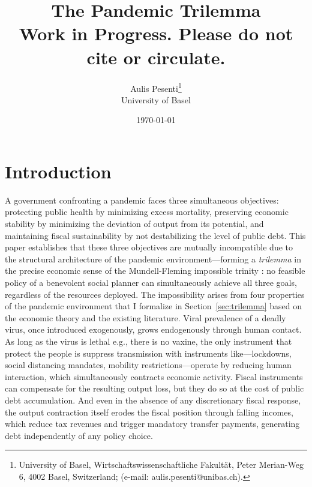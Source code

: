 \documentclass[12pt, a4paper]{article}
\title{\textbf{The Pandemic Trilemma} \\[1em] 
\large Work in Progress. Please do not cite or circulate.}
\author{Aulis Pesenti\setcounter{footnote}{1}\thanks{University of Basel, Wirtschaftswissenschaftliche Fakultät, Peter Merian-Weg 6, 4002 Basel, Switzerland; (e-mail: aulis.pesenti@unibas.ch).} \\ University of Basel}
\date{\today}
\begin{document}
\maketitle

\begin{abstract}

\end{abstract}




\newpage

\section{Introduction}

A government confronting a pandemic faces three simultaneous objectives: protecting public health by minimizing excess mortality, preserving economic stability by minimizing the deviation of output from its potential, and maintaining fiscal sustainability by not destabilizing the level of public debt. This paper establishes that these three objectives are mutually incompatible due to the structural architecture of the pandemic environment---forming a \textit{trilemma} in the precise economic sense of the Mundell-Fleming impossible trinity \citet{mundell1963}: no feasible policy of a benevolent social planner can simultaneously achieve all three goals, regardless of the resources deployed.
The impossibility arises from four properties of the pandemic environment that I formalize in Section~\ref{sec:trilemma} based on the economic theory and the existing literature. Viral prevalence of a deadly virus, once introduced exogenously, grows endogenously through human contact. As long as the virus is lethal e.g., there is no vaxine, the only instrument that protect the people is suppress transmission with instruments like---lockdowns, social distancing mandates, mobility restrictions---operate by reducing human interaction, which simultaneously contracts economic activity. Fiscal instruments can compensate for the resulting output loss, but they do so at the cost of public debt accumulation. And even in the absence of any discretionary fiscal response, the output contraction itself erodes the fiscal position through falling incomes, which reduce tax revenues and trigger mandatory transfer payments, generating debt independently of any policy choice.
\end{document}
